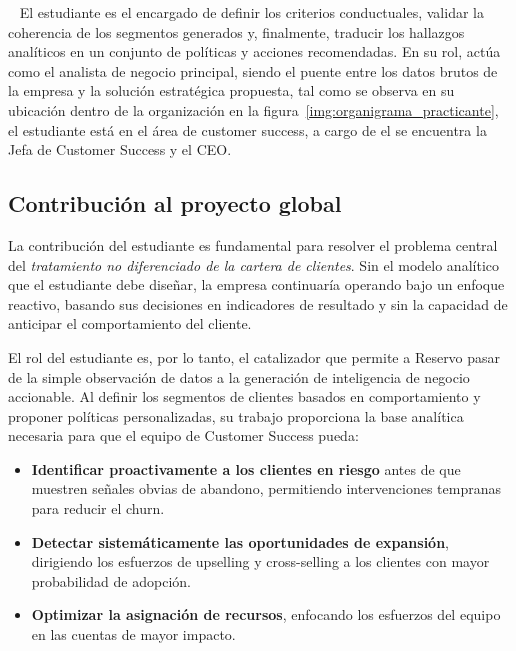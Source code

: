 	~ El estudiante es el encargado de definir los criterios conductuales, validar la coherencia de los segmentos generados y, finalmente, traducir los hallazgos analíticos en un conjunto de políticas y acciones recomendadas. En su rol, actúa como el analista de negocio principal, siendo el puente entre los datos brutos de la empresa y la solución estratégica propuesta, tal como se observa en su ubicación dentro de la organización en la figura~\ref{img:organigrama_practicante}, el estudiante está en el área de customer success, a cargo de el se encuentra la Jefa de Customer Success y el CEO.\\



\subsection{Contribución al proyecto global}

La contribución del estudiante es fundamental para resolver el problema central del \textit{tratamiento no diferenciado de la cartera de clientes}. Sin el modelo analítico que el estudiante debe diseñar, la empresa continuaría operando bajo un enfoque reactivo, basando sus decisiones en indicadores de resultado y sin la capacidad de anticipar el comportamiento del cliente.

El rol del estudiante es, por lo tanto, el catalizador que permite a Reservo pasar de la simple observación de datos a la generación de inteligencia de negocio accionable. Al definir los segmentos de clientes basados en comportamiento y proponer políticas personalizadas, su trabajo proporciona la base analítica necesaria para que el equipo de Customer Success pueda:

\begin{itemize}
    \item \textbf{Identificar proactivamente a los clientes en riesgo} antes de que muestren señales obvias de abandono, permitiendo intervenciones tempranas para reducir el churn.
    \item \textbf{Detectar sistemáticamente las oportunidades de expansión}, dirigiendo los esfuerzos de upselling y cross-selling a los clientes con mayor probabilidad de adopción.
    \item \textbf{Optimizar la asignación de recursos}, enfocando los esfuerzos del equipo en las cuentas de mayor impacto.
\end{itemize}

